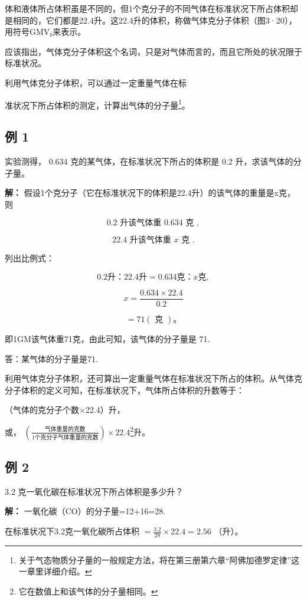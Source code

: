体和液体所占体积虽是不同的，但1个克分子的不同气体在标准状况下所占体积却是相同的，它们都是22.4升。这22.4升的体积，称做气体克分子体积（图3·20），用符号GMV₀来表示。

应该指出，气体克分子体积这个名词，只是对气体而言的，而且它所处的状况限于标准状况。

利用气体克分子体积，可以通过一定重量气体在标

准状况下所占体积的测定，计算出气体的分子量\footnote{关于气态物质分子量的一般规定方法，将在第三册第六章``阿佛加德罗定律''这一章里详细介绍。}。

\subsection{例 1}

实验测得， 0.634 克的某气体，在标准状况下所占的体积是 0.2
升，求该气体的分子量。

\textbf{解：}
假设1个克分子（它在标准状况下的体积是22.4升）的该气体的重量是x克，则

\[
0.2 \text{ 升该气体重 } 0.634 \text{ 克 },
\]

\[
22.4 \text{ 升该气体重 } x \text{ 克 }.
\]

列出比例式：

\[
0.2 \text{升}\text{：} 22.4 \text{升} = 0.634 \text{克}\text{：} x \text{克},
\]

\[
x = \frac {0.634 \times 22.4}{0.2}
\]

\[
= 71 (\text{ 克 })\text{。}
\]

即1GM该气体重71克，由此可知，该气体的分子量是 71.

答：某气体的分子量是71.

利用气体克分子体积，还可算出一定重量气体在标准状况下所占的体积。从气体克分子体积的定义可知，在标准状况下，气体所占体积的升数等于：

（气体的克分子个数×22.4）升，

或，
\(\left(\frac{\text{气体重量的克数}}{1\text{个克分子气体重量的克数}}\right)\times22.4\)\footnote{它在数值上和该气体的分子量相同。}升。

\subsection{例 2}

3.2 克一氧化碳在标准状况下所占体积是多少升？

\textbf{解：} 一氧化碳（CO）的分子量=12+16=28.

在标准状况下3.2克一氧化碳所占体积 \(= \frac{3.2}{28}\times 22.4 = 2.56\)
（升）。

